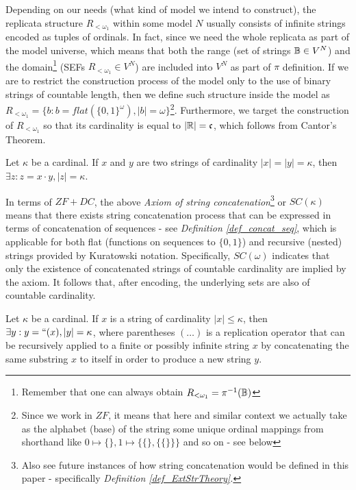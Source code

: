 Depending on our needs (what kind of model we intend to construct), the replicata structure $R_{<\omega_1}$ within some model $N$ usually consists of infinite strings encoded as tuples of ordinals. In fact, since we need the whole replicata as part of the model universe, which means that both the range (set of strings $\mathbb{B} \in V^N$) and the domain\footnote{Remember that one can always obtain $R_{<\omega_1} = \pi^{-1}(\mathbb{B})$} (SEFs $R_{<\omega_1} \in V^N$) are included into $V^N$ as part of $\pi$ definition. If we are to restrict the construction process of the model only to the use of binary strings of countable length, then we define such structure inside the model as $R_{<\omega_1} = \{ b : b = flat(\{0,1\}^\omega), |b| = \omega\}$\footnote{Since we work in $ZF$, it means that here and similar context we actually take as the alphabet (base) of the string some unique ordinal mappings from shorthand like $0 \mapsto \{\}, 1 \mapsto \{\{\},\{\{\}\}\}$ and so on - see \textit{} below}. Furthermore, we target the construction of $R_{<\omega_1}$ so that its cardinality is equal to $|\mathbb{R}| = \mathfrak{c}$, which follows from Cantor's Theorem.

\begin{definition}\label{def_axiom_str_concat}
    Let $\kappa$ be a cardinal. If $x$ and $y$ are two strings of cardinality $|x| = |y| = \kappa$, then $\exists z : z = x \cdot y, |z| = \kappa$.
\end{definition}

In terms of $ZF+DC$, the above \textit{Axiom of string concatenation}\footnote{Also see future instances of how string concatenation would be defined in this paper - specifically \textit{Definition \ref{def_ExtStrTheory}.}} or $SC(\kappa)$ means that there exists string concatenation process that can be expressed in terms of concatenation of sequences - see \textit{Definition \ref{def_concat_seq}}, which is applicable for both flat (functions on sequences to $\{0,1\}$) and recursive (nested) strings provided by Kuratowski notation. Specifically, $SC(\omega)$ indicates that only the existence of concatenated strings of countable cardinality are implied by the axiom. It follows that, after encoding, the underlying sets are also of countable cardinality.

\begin{definition}\label{def_axiom_str_rep}
    Let $\kappa$ be a cardinal. If $x$ is a string of cardinality $|x| \leq \kappa$, then $\exists y : y = \text{``} (x) , |y| = \kappa$, where parentheses $(\dots)$ is a replication operator that can be recursively applied to a finite or possibly infinite string $x$ by concatenating the same substring $x$ to itself in order to produce a new string $y$.
\end{definition}

